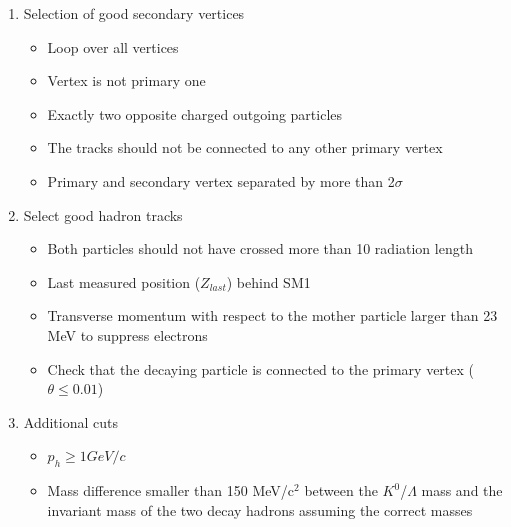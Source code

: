 \begin{enumerate}
  \item Selection of good secondary vertices
  \begin{itemize}
    \item Loop over all vertices
    \item Vertex is not primary one
    \item Exactly two opposite charged outgoing particles
    \item The tracks should not be connected to any other primary vertex
    \item Primary and secondary vertex separated by more than 2$\sigma$
  \end{itemize}
  \item Select good hadron tracks
  \begin{itemize}
    \item Both particles should not have crossed more than 10 radiation length
    \item Last measured position ($Z_{last}$) behind SM1
    \item Transverse momentum with respect to the mother particle larger than 23 MeV to suppress electrons
    \item Check that the decaying particle is connected to the primary vertex ($\theta \le 0.01$)
  \end{itemize}
  \item Additional cuts
  \begin{itemize}
    \item $p_h \geq 1 GeV/c$
    \item Mass difference smaller than 150 MeV/c$^2$ between the $K^0$/$\Lambda$ mass and the invariant mass of the two decay hadrons assuming the correct masses
  \end{itemize}
\end{enumerate}

